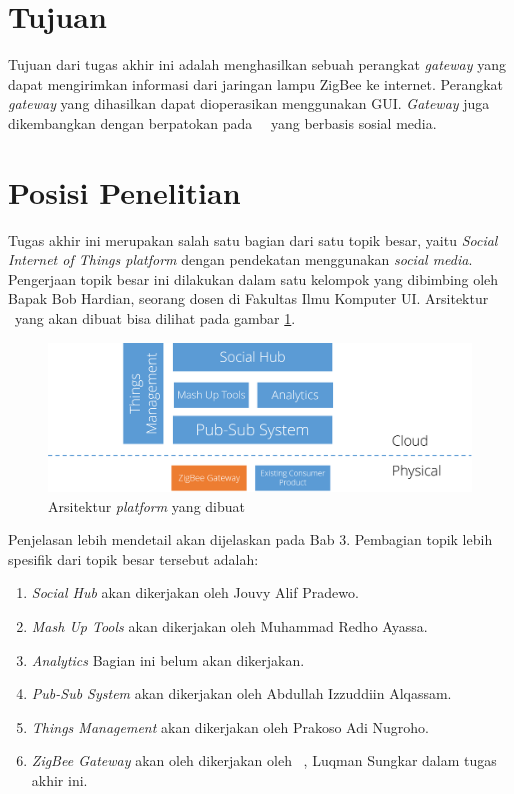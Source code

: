 \section{Tujuan}
Tujuan dari tugas akhir ini adalah menghasilkan sebuah perangkat \textit{gateway} yang dapat mengirimkan informasi dari jaringan lampu ZigBee ke internet. Perangkat \textit{gateway} yang dihasilkan dapat dioperasikan menggunakan GUI. \textit{Gateway} juga dikembangkan dengan berpatokan pada \plat~\iot~yang berbasis sosial media. 

\section{Posisi Penelitian}

Tugas akhir ini merupakan salah satu bagian dari satu topik besar, yaitu \textit{Social Internet of Things platform} dengan pendekatan menggunakan \textit{social media}. Pengerjaan topik besar ini dilakukan dalam satu kelompok yang dibimbing oleh Bapak Bob Hardian, seorang dosen di Fakultas Ilmu Komputer UI. Arsitektur \plat~yang akan dibuat bisa dilihat pada gambar \ref{fig:arsitektur-siot}.

\begin{figure}
	\centering
	\includegraphics[width=.9\textwidth]{pics/rancangan-siot.PNG}
	\caption{Arsitektur \textit{platform} yang dibuat}
	\label{fig:arsitektur-siot}
\end{figure}

Penjelasan lebih mendetail akan dijelaskan pada Bab 3. Pembagian topik lebih spesifik dari topik besar tersebut adalah:
\begin{enumerate}
	\item \textit{Social Hub} akan dikerjakan oleh Jouvy Alif Pradewo.
	\item \textit{Mash Up Tools} akan dikerjakan oleh Muhammad Redho Ayassa.
	\item \textit{Analytics} Bagian ini belum akan dikerjakan.
	\item \textit{Pub-Sub System} akan dikerjakan oleh Abdullah Izzuddiin Alqassam.
	\item \textit{Things Management} akan dikerjakan oleh Prakoso Adi Nugroho.
	\item \textit{ZigBee Gateway} akan oleh dikerjakan oleh \saya~, Luqman Sungkar dalam tugas akhir ini.
	
\end{enumerate}

